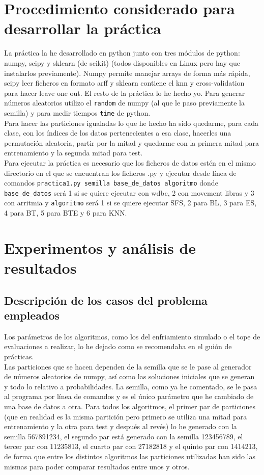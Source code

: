 \documentclass[12pt]{article}
\begin{document}
\newpage

\section{Procedimiento considerado para desarrollar la práctica}
La práctica la he desarrollado en python junto con tres módulos de python: numpy, scipy y sklearn (de scikit) (todos disponibles en Linux pero hay que instalarlos previamente). Numpy permite manejar arrays de forma más rápida, scipy leer ficheros en formato arff y sklearn contiene el knn y cross-validation para hacer leave one out. El resto de la práctica lo he hecho yo. Para generar números aleatorios utilizo el \texttt{random} de numpy (al que le paso previamente la semilla) y para medir tiempos \texttt{time} de python.\\

Para hacer las particiones igualadas lo que he hecho ha sido quedarme, para cada clase, con los índices de los datos pertenecientes a esa clase, hacerles una permutación aleatoria, partir por la mitad y quedarme con la primera mitad para entrenamiento y la segunda mitad para test.\\

Para ejecutar la práctica es necesario que los ficheros de datos estén en el mismo directorio en el que se encuentran los ficheros .py y ejecutar desde línea de comandos \texttt{practica1.py semilla base\_de\_datos algoritmo} donde \texttt{base\_de\_datos} será 1 si se quiere ejecutar con wdbc, 2 con movement libras y 3 con arritmia y \texttt{algoritmo} será 1 si se quiere ejecutar SFS, 2 para BL, 3 para ES, 4 para BT, 5 para BTE y 6 para KNN.

\newpage

\section{Experimentos y análisis de resultados}
\subsection{Descripción de los casos del problema empleados}

Los parámetros de los algoritmos, como los del enfriamiento simulado o el tope de evaluaciones a realizar, lo he dejado como se recomendaba en el guión de prácticas.\\
Las particiones que se hacen dependen de la semilla que se le pase al generador de números aleatorios de numpy, así como las soluciones iniciales que se generan y todo lo relativo a probabilidades. La semilla, como ya he comentado, se le pasa al programa por línea de comandos y es el único parámetro que he cambiado de una base de datos a otra. Para todos los algoritmos, el primer par de particiones (que en realidad es la misma partición pero primero se utiliza una mitad para entrenamiento y la otra para test y después al revés) lo he generado con la semilla 567891234, el segundo par está generado con la semilla 123456789, el tercer par con 11235813, el cuarto par con 27182818 y el quinto par con 1414213, de forma que entre los distintos algoritmos las particiones utilizadas han sido las mismas para poder comparar resultados entre unos y otros.
\end{document}
